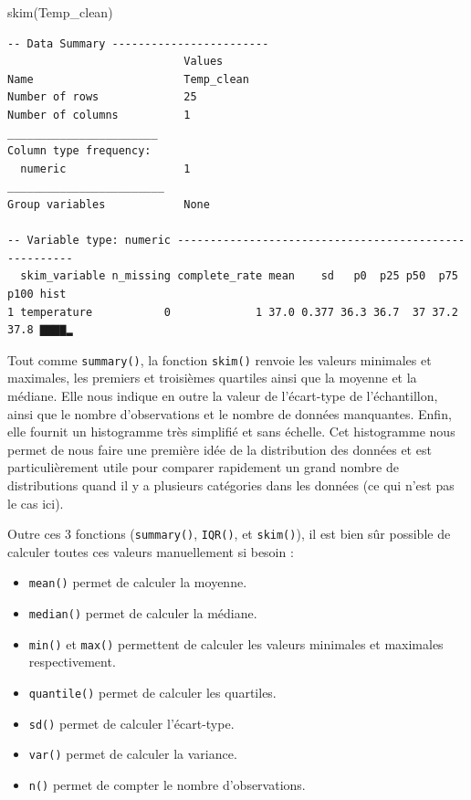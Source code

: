 \documentclass[
  a4paper,
  DIV=11,
  numbers=noendperiod,
  oneside]{scrreprt}
\newenvironment{Shaded}{}{}
\newcommand{\FunctionTok}[1]{\textcolor[rgb]{0.44,0.26,0.76}{#1}}
\newcommand{\NormalTok}[1]{\textcolor[rgb]{0.14,0.16,0.18}{#1}}
\providecommand{\tightlist}{%
  \setlength{\itemsep}{0pt}\setlength{\parskip}{0pt}}\usepackage{longtable,booktabs,array}
\begin{document}
\begin{Shaded}
\begin{Highlighting}[]
\FunctionTok{skim}\NormalTok{(Temp\_clean)}
\end{Highlighting}
\end{Shaded}

\begin{verbatim}
-- Data Summary ------------------------
                           Values    
Name                       Temp_clean
Number of rows             25        
Number of columns          1         
_______________________              
Column type frequency:               
  numeric                  1         
________________________             
Group variables            None      

-- Variable type: numeric ------------------------------------------------------
  skim_variable n_missing complete_rate mean    sd   p0  p25 p50  p75 p100 hist 
1 temperature           0             1 37.0 0.377 36.3 36.7  37 37.2 37.8 ▇▇▇▇▂
\end{verbatim}

Tout comme \texttt{summary()}, la fonction \texttt{skim()} renvoie les
valeurs minimales et maximales, les premiers et troisièmes quartiles
ainsi que la moyenne et la médiane. Elle nous indique en outre la valeur
de l'écart-type de l'échantillon, ainsi que le nombre d'observations et
le nombre de données manquantes. Enfin, elle fournit un histogramme très
simplifié et sans échelle. Cet histogramme nous permet de nous faire une
première idée de la distribution des données et est particulièrement
utile pour comparer rapidement un grand nombre de distributions quand il
y a plusieurs catégories dans les données (ce qui n'est pas le cas ici).

Outre ces 3 fonctions (\texttt{summary()}, \texttt{IQR()}, et
\texttt{skim()}), il est bien sûr possible de calculer toutes ces
valeurs manuellement si besoin :

\begin{itemize}
\tightlist
\item
  \texttt{mean()} permet de calculer la moyenne.
\item
  \texttt{median()} permet de calculer la médiane.
\item
  \texttt{min()} et \texttt{max()} permettent de calculer les valeurs
  minimales et maximales respectivement.
\item
  \texttt{quantile()} permet de calculer les quartiles.
\item
  \texttt{sd()} permet de calculer l'écart-type.
\item
  \texttt{var()} permet de calculer la variance.
\item
  \texttt{n()} permet de compter le nombre d'observations.
\end{itemize}
\end{document}
